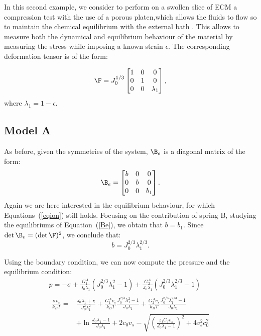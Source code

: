 In this second example, we consider to perform on a swollen slice of ECM a compression test with the use of a porous platen,which allows the fluids to flow so to maintain the chemical equilibrium with the external bath \cite{Netti}. This allows to measure both the dynamical and equilibrium behaviour of the material by measuring the stress while imposing a known strain $\epsilon$. The corresponding deformation tensor is of the form:

\begin{equation}
\F=J_0^{1/3}\begin{bmatrix}
1 &0&0\\
0&1&0\\
0&0& \lambda_1
\end{bmatrix},
\label{F} 
\end{equation}
where $\lambda_1 = 1 - \epsilon$. 
\subsection{Model A}
As before, given the symmetries of the system, $\B_e$ is a diagonal matrix of the form:
\begin{equation}
\B_e=\begin{bmatrix}
b &0&0\\
0&b&0\\
0&0& b_1
\end{bmatrix}. 
\end{equation}
Again we are here interested in the equilibrium behaviour, for which Equations~(\ref{eqion}) still holds. Focusing on the contribution of spring B, studying the equilibriums of Equation~(\ref{Be}), we obtain that $b=b_1$. Since $\det \B_e= (\det \F)^2$, we conclude that:
\begin{equation}
b = J_0^{2/3}\lambda_1^{2/3}.
\end{equation}

Using the boundary condition, we can now compute the pressure and the equilibrium condition:
\begin{gather}
p = -\sigma + \frac{G^A_1}{J_0\lambda_1} (J^{2/3}_0\lambda_1^2-1)+\frac{G^A_2}{J_0\lambda_1} (J_0^{2/3} \lambda_1^{2/3}-1) \\
\begin{aligned}
\frac{\sigma v_s}{k_B T}=&\frac{J_0\lambda_1+\chi}{J_0^2\lambda^2_1}+\frac{G_1^Av_s}{k_BT} \frac{J_0^{2/3}\lambda^2_1-1}{J_0 \lambda_1}+\frac{G_2^Av_s}{k_BT} \frac{J_0^{2/3}\lambda^{2/3}_1-1}{J_0 \lambda_1}\\[1.5mm]
&+\ln \frac{J_0\lambda_1-1}{J_0\lambda_1} +2c_0v_s-\sqrt{\left(\frac{z_fC_fv_s}{J_0\lambda_1-1}\right)^2+4v_s^2c^2_0}\label{compA}
\end{aligned}
\end{gather}

